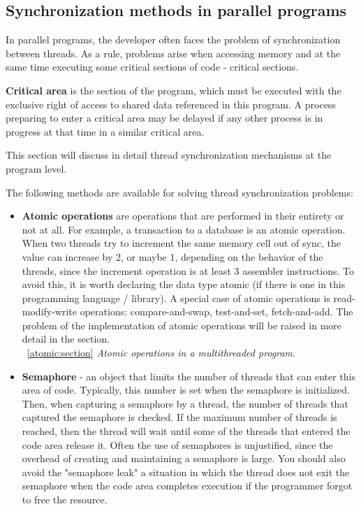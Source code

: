 { %
	\subsection{Synchronization methods in parallel programs}
	\par In parallel programs, the developer often faces the problem of synchronization between threads. As a rule, problems arise when accessing memory and at the same time executing some critical sections of code - critical sections.
	\par\textbf{Critical area} is the section of the program, which must be executed with the exclusive right of access to shared data referenced in this program. A process preparing to enter a critical area may be delayed if any other process is in progress at that time in a similar critical area. 
	\par This section will discuss in detail thread synchronization mechanisms at the program level.
	\par The following methods are available for solving thread synchronization problems:
		\begin{itemize}
			\item\textbf{Atomic operations} are operations that are performed in their entirety or not at all. For example, a transaction to a database is an atomic operation. When two threads try to increment the same memory cell out of sync, the value can increase by 2, or maybe 1, depending on the behavior of the threads, since the increment operation is at least 3 assembler instructions. To avoid this, it is worth declaring the data type atomic (if there is one in this programming language / library). A special case of atomic operations is read-modify-write operations: compare-and-swap, test-and-set, fetch-and-add. The problem of the implementation of atomic operations will be raised in more detail in the section.\\~\ref{atomic:section} \textit{Atomic operations in a multithreaded program}.
			\item\textbf{Semaphore} - an object that limits the number of threads that can enter this area of code. Typically, this number is set when the semaphore is initialized. Then, when capturing a semaphore by a thread, the number of threads that captured the semaphore is checked. If the maximum number of threads is reached, then the thread will wait until some of the threads that entered the code area release it. Often the use of semaphores is unjustified, since the overhead of creating and maintaining a semaphore is large. You should also avoid the "semaphore leak" a situation in which the thread does not exit the semaphore when the code area completes execution if the programmer forgot to free the resource.

\end{itemize}}

